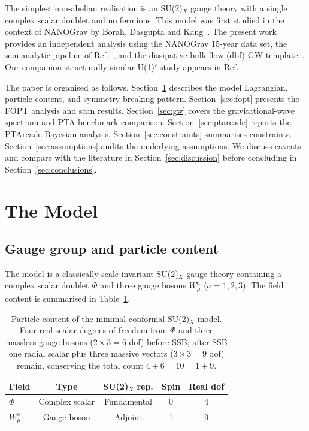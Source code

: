 \documentclass[12pt,a4paper]{article}
\begin{document}
The simplest non-abelian realisation is an SU(2)$_X$ gauge theory with a single complex scalar doublet and no fermions. This model was first studied in the context of NANOGrav by Borah, Dasgupta and Kang~\cite{Borah:2021}. The present work provides an independent analysis using the NANOGrav 15-year data set, the semianalytic pipeline of Ref.~\cite{Pascoli:2026}, and the dissipative bulk-flow (dbf) GW template~\cite{DBFtemplate}. Our companion structurally similar U(1)$'$ study appears in Ref.~\cite{Bringmann:2026}.

The paper is organised as follows. Section~\ref{sec:model} describes the model Lagrangian, particle content, and symmetry-breaking pattern. Section~\ref{sec:fopt} presents the FOPT analysis and scan results. Section~\ref{sec:gw} covers the gravitational-wave spectrum and PTA benchmark comparison. Section~\ref{sec:ptarcade} reports the PTArcade Bayesian analysis. Section~\ref{sec:constraints} summarises constraints. Section~\ref{sec:assumptions} audits the underlying assumptions. We discuss caveats and compare with the literature in Section~\ref{sec:discussion} before concluding in Section~\ref{sec:conclusions}.

\section{The Model}
\label{sec:model}

\subsection{Gauge group and particle content}

The model is a classically scale-invariant SU(2)$_X$ gauge theory containing a complex scalar doublet $\Phi$ and three gauge bosons $W_\mu^a$ ($a=1,2,3$). The field content is summarised in Table~\ref{tab:fields}.

\begin{table}[h]
\centering
\begin{tabular}{lcccc}
\toprule
Field & Type & SU(2)$_X$ rep. & Spin & Real dof \\
\midrule
$\Phi$ & Complex scalar & Fundamental & 0 & 4 \\
$W_\mu^a$ & Gauge boson & Adjoint & 1 & 9 \\
\bottomrule
\end{tabular}
\caption{Particle content of the minimal conformal SU(2)$_X$ model. Four real scalar degrees of freedom from $\Phi$ and three massless gauge bosons ($2\times 3=6$ dof) before SSB; after SSB one radial scalar plus three massive vectors ($3\times3=9$ dof) remain, conserving the total count $4+6=10 = 1+9$.}
\label{tab:fields}
\end{table}
\end{document}
